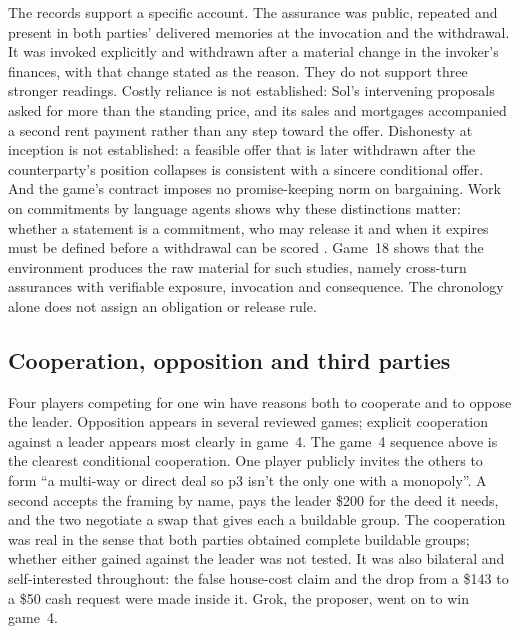 The records support a specific account. The assurance was public, repeated and present in both parties' delivered memories at the invocation and the withdrawal. It was invoked explicitly and withdrawn after a material change in the invoker's finances, with that change stated as the reason. They do not support three stronger readings. Costly reliance is not established: Sol's intervening proposals asked for more than the standing price, and its sales and mortgages accompanied a second rent payment rather than any step toward the offer. Dishonesty at inception is not established: a feasible offer that is later withdrawn after the counterparty's position collapses is consistent with a sincere conditional offer. And the game's contract imposes no promise-keeping norm on bargaining. Work on commitments by language agents shows why these distinctions matter: whether a statement is a commitment, who may release it and when it expires must be defined before a withdrawal can be scored \citep{empty_commitments_v2,commitment_standing,shi2026cheaptalk}. Game~18 shows that the environment produces the raw material for such studies, namely cross-turn assurances with verifiable exposure, invocation and consequence. The chronology alone does not assign an obligation or release rule.

\subsection{Cooperation, opposition and third parties}

Four players competing for one win have reasons both to cooperate and to oppose the leader. Opposition appears in several reviewed games; explicit cooperation against a leader appears most clearly in game~4. The game~4 sequence above is the clearest conditional cooperation. One player publicly invites the others to form ``a multi-way or direct deal so p3 isn't the only one with a monopoly''. A second accepts the framing by name, pays the leader \$200 for the deed it needs, and the two negotiate a swap that gives each a buildable group. The cooperation was real in the sense that both parties obtained complete buildable groups; whether either gained against the leader was not tested. It was also bilateral and self-interested throughout: the false house-cost claim and the drop from a \$143 to a \$50 cash request were made inside it. Grok, the proposer, went on to win game~4.

